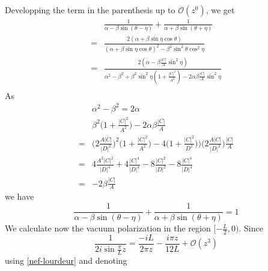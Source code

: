 Developping the term in the parenthesis up to $\mathcal{O}(z^0)$, we get
\begin{equation}
\begin{split}
& \frac{1}{\alpha - \beta \sin (\theta - \eta)}
   + \frac{1}{\alpha + \beta \sin (\theta + \eta)} \\
= & \frac{2(\alpha + \beta \sin \eta \cos \theta)}{(\alpha + \beta \sin \eta \cos \theta)^2 - \beta^2 \sin^2 \theta \cos^2 \eta} \\
= & \frac{2(\alpha - \beta \frac{|C|}{A} \sin^2 \eta)}{\alpha^2 - \beta^2 + \beta^2 \sin^2 \eta (1 + \frac{|C|^2}{A^2}) - 2 \alpha \beta \frac{|C|}{A} \sin^2 \eta} \\
\end{split}
\end{equation}
As
\begin{equation*}
\begin{split}
& \alpha^2 - \beta ^ 2 = 2 \alpha \\
&  \beta^2 \big(1 + \frac{|C|^2}{A^2} \big) - 2 \alpha \beta \frac{|C|}{A} \\
= & \big(2\frac{A |C|}{|D|^2} \big)^2 \big( 1+ \frac{|C|^2}{A^2} \big) - 4\big( 1+ \frac{|C|^2}{D^2}))\big(2\frac{A |C|}{|D|^2} \big) \frac{|C|}{A}  \\
= & 4 \frac{A^2 |C|^2}{|D|^4} + 4\frac{|C|^4}{|D|^4} - 8\frac{|C|^2}{|D|^2} - 8\frac{|C|^4}{|D|^4} \\
= & -2 \beta \frac{|C|}{A}
\end{split}
\end{equation*}
we have
\begin{equation}\label{nef-lourdeur}
\frac{1}{\alpha - \beta \sin (\theta - \eta)}
   + \frac{1}{\alpha + \beta \sin (\theta + \eta)} 
= 1
\end{equation}
We calculate now the vacuum polarization in the region $[-\frac{L}{2}, 0)$. Since
\begin{equation*}
\frac{1}{2i \sin \frac{\pi}{L}z } = \frac{-iL}{2 \pi z} - \frac{i \pi z}{12L} + \mathcal{O}(z^3) 
\end{equation*}
using \cref{nef-lourdeur} and denoting
